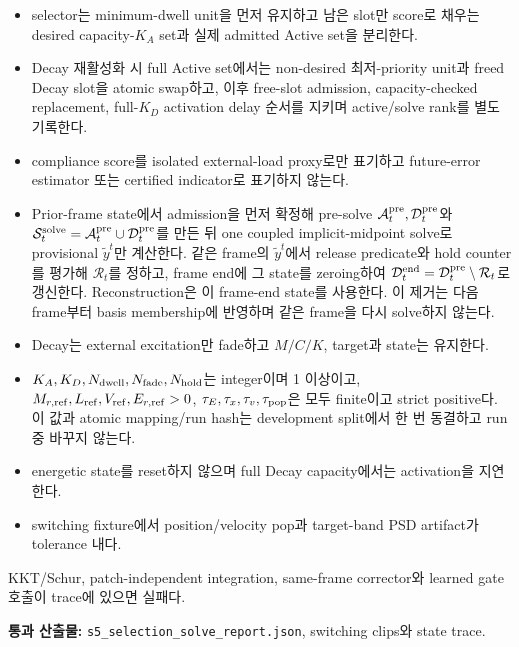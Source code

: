 \documentclass[10pt]{article}
\newcommand{\code}[1]{{\small\nolinkurl{#1}}}
\newcommand{\pass}[1]{\textcolor{GateGreen}{\textbf{#1}}}
\begin{document}
\begin{itemize}
  \item [\(\square\)] selector는 minimum-dwell unit을 먼저 유지하고 남은 slot만
  score로 채우는 desired capacity-\(K_A\) set과 실제 admitted Active set을 분리한다.
  \item [\(\square\)] Decay 재활성화 시 full Active set에서는 non-desired 최저-priority unit과
  freed Decay slot을 atomic swap하고, 이후 free-slot admission, capacity-checked replacement,
  full-\(K_D\) activation delay 순서를 지키며 active/solve rank를 별도 기록한다.
  \item [\(\square\)] compliance score를 isolated external-load proxy로만 표기하고
  future-error estimator 또는 certified indicator로 표기하지 않는다.
  \item [\(\square\)] Prior-frame state에서 admission을 먼저 확정해
  pre-solve \(\mathcal A_t^{\rm pre},\mathcal D_t^{\rm pre}\)와
  \(\mathcal S_t^{\rm solve}=\mathcal A_t^{\rm pre}\cup\mathcal D_t^{\rm pre}\)를 만든 뒤
  one coupled implicit-midpoint solve로 provisional \(\widetilde y^t\)만 계산한다.
  같은 frame의 \(\widetilde y^t\)에서 release predicate와 hold counter를 평가해
  \(\mathcal R_t\)를 정하고, frame end에 그 state를 zeroing하여
  \(\mathcal D_t^{\rm end}=\mathcal D_t^{\rm pre}\setminus\mathcal R_t\)로 갱신한다.
  Reconstruction은 이 frame-end state를 사용한다. 이 제거는 다음 frame부터 basis membership에
  반영하며 같은 frame을 다시 solve하지 않는다.
  \item [\(\square\)] Decay는 external excitation만 fade하고 \(M/C/K\), target과 state는 유지한다.
  \item [\(\square\)] \(K_A,K_D,N_{\rm dwell},N_{\rm fade},N_{\rm hold}\)는 integer이며 1 이상이고,
  \(M_{r,\rm ref},L_{\rm ref},V_{\rm ref},E_{r,\rm ref}>0\),
  \(\tau_E,\tau_x,\tau_v,\tau_{\rm pop}\)은 모두 finite이고 strict positive다.
  이 값과 atomic mapping/run hash는 development split에서 한 번 동결하고 run 중 바꾸지 않는다.
  \item [\(\square\)] energetic state를 reset하지 않으며 full Decay capacity에서는 activation을 지연한다.
  \item [\(\square\)] switching fixture에서 position/velocity pop과 target-band PSD artifact가 tolerance 내다.
\end{itemize}

KKT/Schur, patch-independent integration, same-frame corrector와 learned gate 호출이 trace에 있으면 실패다.

\pass{통과 산출물:} \code{s5\_selection\_solve\_report.json}, switching clips와 state trace.
\end{document}
